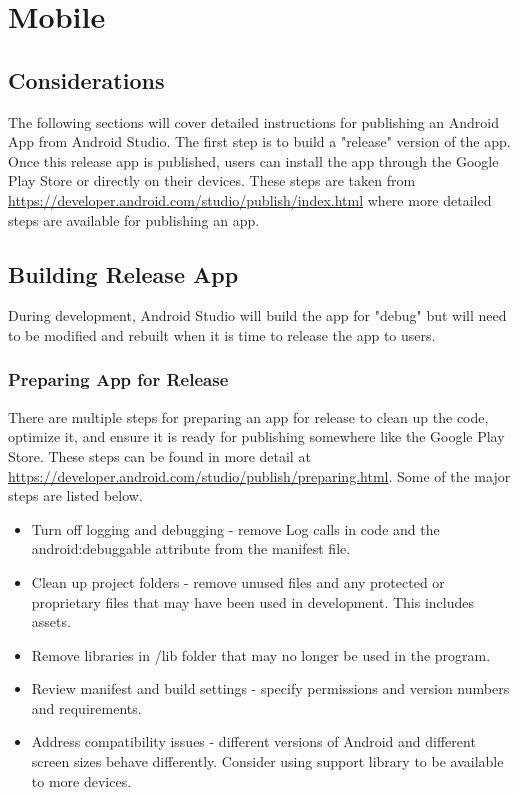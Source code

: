
\section{Mobile}
\subsection{Considerations}
\tab The following sections will cover detailed instructions for publishing an Android App from Android Studio. The first step is to build a "release" version of the app. Once this release app is published, users can install the app through the Google Play Store or directly on their devices. These steps are taken from \url{https://developer.android.com/studio/publish/index.html} where more detailed steps are available for publishing an app.

\subsection{Building Release App}
During development, Android Studio will build the app for "debug" but will need to be modified and rebuilt when it is time to release the app to users.
\subsubsection{Preparing App for Release}
There are multiple steps for preparing an app for release to clean up the code, optimize it, and ensure it is ready for publishing somewhere like the Google Play Store. These steps can be found in more detail at \url{https://developer.android.com/studio/publish/preparing.html}. Some of the major steps are listed below.
\begin{itemize}
    \item Turn off logging and debugging - remove Log calls in code and the android:debuggable attribute from the manifest file.
    \item Clean up project folders - remove unused files and any protected or proprietary files that may have been used in development. This includes assets.
    \item Remove libraries in /lib folder that may no longer be used in the program.
    \item Review manifest and build settings - specify permissions and version numbers and requirements.
    \item Address compatibility issues - different versions of Android and different screen sizes behave differently. Consider using support library to be available to more devices.
\end{itemize}
